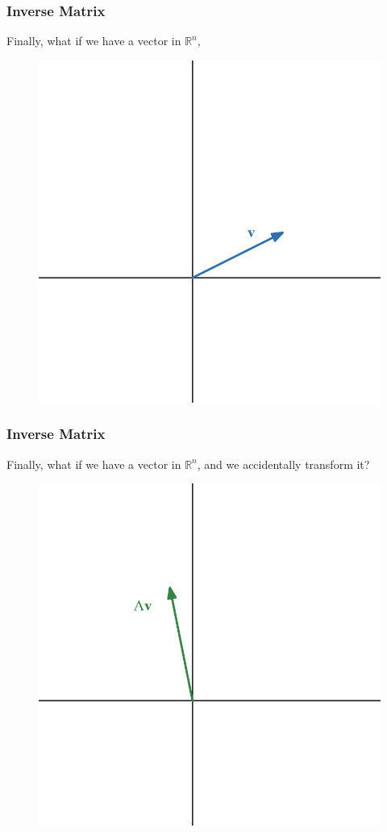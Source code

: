 \documentclass{beamer}
\newcommand{\R}{\mathbb{R}}
\begin{document}
\begin{frame}
  \frametitle{Inverse Matrix}

Finally, what if we have a vector in $\R^n$,

\begin{figure}
    \centering
    \includegraphics[width=0.5\linewidth]{matrix product/desmos-graph (9).png}
\end{figure}    
\end{frame}


\begin{frame}
  \frametitle{Inverse Matrix}

Finally, what if we have a vector in $\R^n$, and we accidentally transform it?

\begin{figure}
    \centering
    \includegraphics[width=0.5\linewidth]{matrix product/desmos-graph (10).png}
\end{figure}    
\end{frame}
\end{document}
